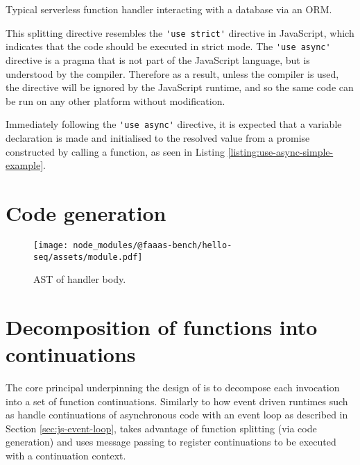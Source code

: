 \begin{listing}[H]
  \inputminted{javascript}{node_modules/@faaas-bench/hello-seq/src/onHttpGetHello.trigger.ts}
  \caption{Typical serverless function handler interacting with a database via an ORM.}
\end{listing}

This splitting directive resembles the \verb|'use strict'| directive in JavaScript, which indicates that the code should be executed in strict mode. The \verb|'use async'| directive is a pragma that is not part of the JavaScript language, but is understood by the \faaasc{} compiler. Therefore as a result, unless the \faaasc{} compiler is used, the directive will be ignored by the JavaScript runtime, and so the same code can be run on any other \faas{} platform without modification.


Immediately following the \verb|'use async'| directive, it is expected that a variable declaration is made and initialised to the resolved value from a promise constructed by calling a function, as seen in Listing \ref{listing:use-async-simple-example}.

\section{Code generation}
\label{sec:faaasc-codegen-ast}

\begin{figure}[t]
    \texttt{[image: node\_modules/@faaas-bench/hello-seq/assets/module.pdf]}
    \caption{AST of handler body.}
    \label{fig:suites-hello-seq-module-ast}
\end{figure}

\section{Decomposition of \faas{} functions into continuations}
The core principal underpinning the design of \faaas{} is to decompose each \faas{} invocation into a set of function continuations. Similarly to how event driven runtimes such as \js{} handle continuations of asynchronous code with an event loop as described in Section \ref{sec:js-event-loop}, \faaas{} takes advantage of function splitting (via code generation) and uses message passing to register continuations to be executed with a continuation context.

